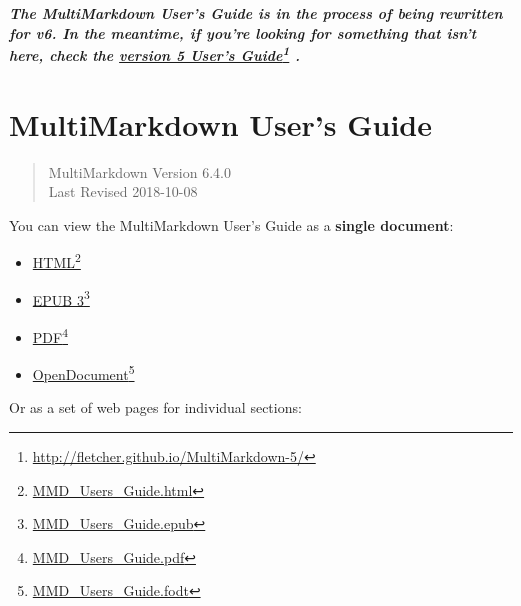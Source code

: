 
\def\mytitle{MultiMarkdown User's Guide}
\def\myauthor{Fletcher T. Penney}
\def\version{6.4.0}
\def\revised{2018-10-08}




\textbf{\emph{The MultiMarkdown User's Guide is in the process of being rewritten for v6. In the meantime, if you're looking for something that isn't here, check the \href{http://fletcher.github.io/MultiMarkdown-5/}{version 5 User's Guide}\footnote{\href{http://fletcher.github.io/MultiMarkdown-5/}{http:\slash{}\slash{}fletcher.github.io\slash{}MultiMarkdown-5\slash{}}} .}}

\chapter{MultiMarkdown User's Guide}
\label{title}

\begin{quote}
MultiMarkdown Version 6.4.0\\
Last Revised 2018-10-08
\end{quote}

You can view the MultiMarkdown User's Guide as a \textbf{single document}:

\begin{itemize}
\item \href{MMD_Users_Guide.html}{HTML}\footnote{\href{MMD_Users_Guide.html}{MMD\_Users\_Guide.html}}

\item \href{MMD_Users_Guide.epub}{EPUB 3}\footnote{\href{MMD_Users_Guide.epub}{MMD\_Users\_Guide.epub}}

\item \href{MMD_Users_Guide.pdf}{PDF}\footnote{\href{MMD_Users_Guide.pdf}{MMD\_Users\_Guide.pdf}}

\item \href{MMD_Users_Guide.fodt}{OpenDocument}\footnote{\href{MMD_Users_Guide.fodt}{MMD\_Users\_Guide.fodt}}

\end{itemize}

Or as a set of web pages for individual sections:

